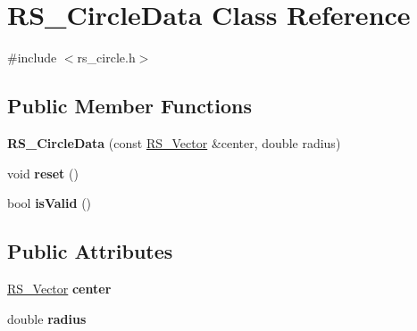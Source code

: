 \hypertarget{classRS__CircleData}{\section{R\-S\-\_\-\-Circle\-Data Class Reference}
\label{classRS__CircleData}
}


{\ttfamily \#include $<$rs\-\_\-circle.\-h$>$}

\subsection*{Public Member Functions}
\begin{DoxyCompactItemize}
\item 
\hypertarget{classRS__CircleData_aa4f1a8fc33b0f469011d74c620a47f38}{{\bfseries R\-S\-\_\-\-Circle\-Data} (const \hyperlink{classRS__Vector}{R\-S\-\_\-\-Vector} \&center, double radius)}\label{classRS__CircleData_aa4f1a8fc33b0f469011d74c620a47f38}

\item 
\hypertarget{classRS__CircleData_ae2983a0e46c0f0dcd02e33031f40d6cd}{void {\bfseries reset} ()}\label{classRS__CircleData_ae2983a0e46c0f0dcd02e33031f40d6cd}

\item 
\hypertarget{classRS__CircleData_aea169bd6ee564bc13b6f68e997b7e74c}{bool {\bfseries is\-Valid} ()}\label{classRS__CircleData_aea169bd6ee564bc13b6f68e997b7e74c}

\end{DoxyCompactItemize}
\subsection*{Public Attributes}
\begin{DoxyCompactItemize}
\item 
\hypertarget{classRS__CircleData_ad2b663f9f37c36eb776a9c4368d29d06}{\hyperlink{classRS__Vector}{R\-S\-\_\-\-Vector} {\bfseries center}}\label{classRS__CircleData_ad2b663f9f37c36eb776a9c4368d29d06}

\item 
\hypertarget{classRS__CircleData_ac13bff7aa8e71eb06eec208cf6d302d1}{double {\bfseries radius}}\label{classRS__CircleData_ac13bff7aa8e71eb06eec208cf6d302d1}

\end{DoxyCompactItemize}

